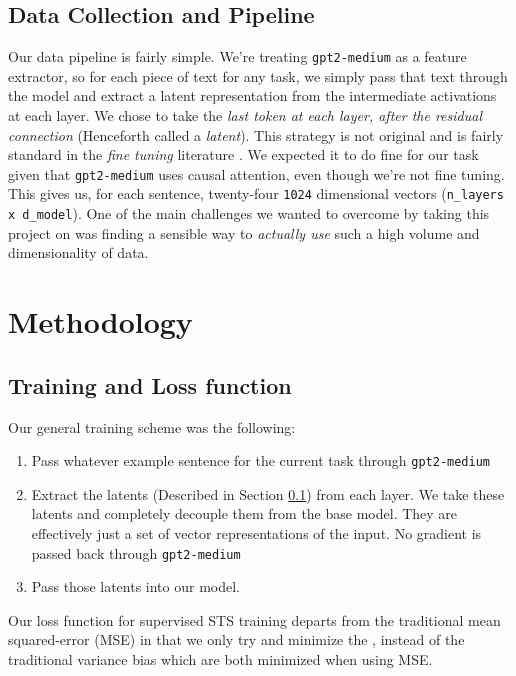 \documentclass[14pt, twocolumn]{article}
\begin{document}
\subsection{Data Collection and Pipeline} \label{latent}
Our data pipeline is fairly simple. We're treating \verb|gpt2-medium| as a feature extractor, so for each piece of text for any task, we simply pass that text through the model and extract a latent representation from the intermediate activations at each layer. We chose to take the \textit{last token at each layer, after the residual connection} (Henceforth called a \textit{latent}). This strategy is not original and is fairly standard in the \textit{fine tuning} literature \cite{LLMEmbed}. We expected it to do fine for our task given that \verb|gpt2-medium| uses causal attention, even though we're not fine tuning. This gives us, for each sentence, twenty-four \verb|1024| dimensional vectors (\verb|n_layers x d_model|). One of the main challenges we wanted to overcome by taking this project on was finding a sensible way to \textit{actually use} such a high volume and dimensionality of data.


\section{Methodology}
\subsection{Training and Loss function} \label{Loss} \label{Training}
Our general training scheme was the following:
\begin{enumerate}
    \item Pass whatever example sentence for the current task through \verb|gpt2-medium|
    \item Extract the latents (Described in Section \ref{latent}) from each layer. We take these latents and completely decouple them from the base model. They are effectively just a set of vector representations of the input. No gradient is passed back through \verb|gpt2-medium|
    \item Pass those latents into our model.
\end{enumerate}
Our loss function for supervised STS training departs from the traditional mean squared-error (MSE) in that we only try and minimize the , instead of the traditional variance  bias which are both minimized when using MSE.
\end{document}
